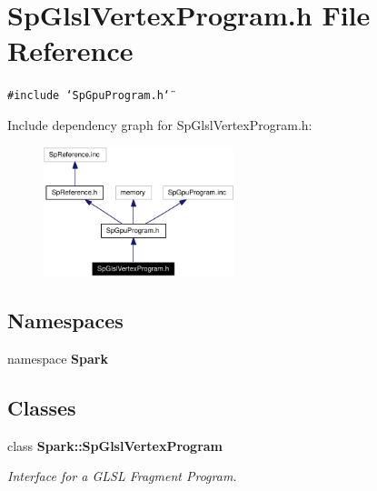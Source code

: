 \section{Sp\-Glsl\-Vertex\-Program.h File Reference}
\label{SpGlslVertexProgram_8h}
{\tt \#include \char`\"{}Sp\-Gpu\-Program.h\char`\"{}}\par


Include dependency graph for Sp\-Glsl\-Vertex\-Program.h:\begin{figure}[H]
\begin{center}
\leavevmode
\includegraphics[width=157pt]{SpGlslVertexProgram_8h__incl}
\end{center}
\end{figure}
\subsection*{Namespaces}
\begin{CompactItemize}
\item 
namespace {\bf Spark}
\end{CompactItemize}
\subsection*{Classes}
\begin{CompactItemize}
\item 
class {\bf Spark::Sp\-Glsl\-Vertex\-Program}
\begin{CompactList}\small\item\em Interface for a GLSL Fragment Program. \item\end{CompactList}\end{CompactItemize}
